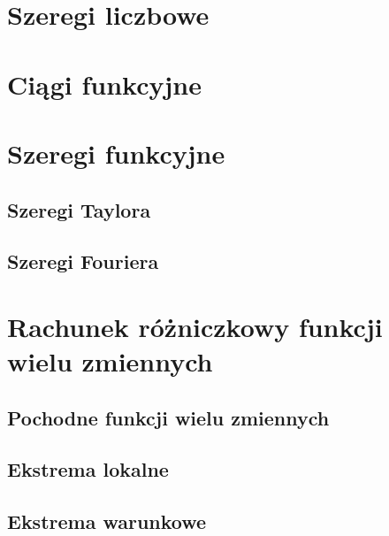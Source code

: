 \documentclass[11pt]{scrartcl}
\begin{document}
    \section{Szeregi liczbowe}
    

    \section{Ciągi funkcyjne}
    

    \section{Szeregi funkcyjne}
    
        \subsection{Szeregi Taylora}
        
        \subsection{Szeregi Fouriera}
        


    \section{Rachunek różniczkowy funkcji wielu zmiennych}
    
        \subsection{Pochodne funkcji wielu zmiennych}
        
        \subsection{Ekstrema lokalne}
        
        \subsection{Ekstrema warunkowe}
        
\end{document}
